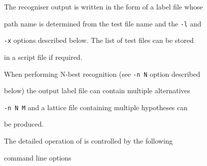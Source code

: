 The recogniser output is written in the form of a label file whose


path name is determined from the test file name and the \texttt{-l} and 


\texttt{-x} options described below. The list of test files can be stored 


in a script file if required.





When performing N-best recognition (see \texttt{-n N} option described


below) the output label file can contain multiple alternatives


\texttt{-n N M} and a lattice file containing multiple hypotheses can


be produced.





The detailed operation of  is controlled by the following


command line options


